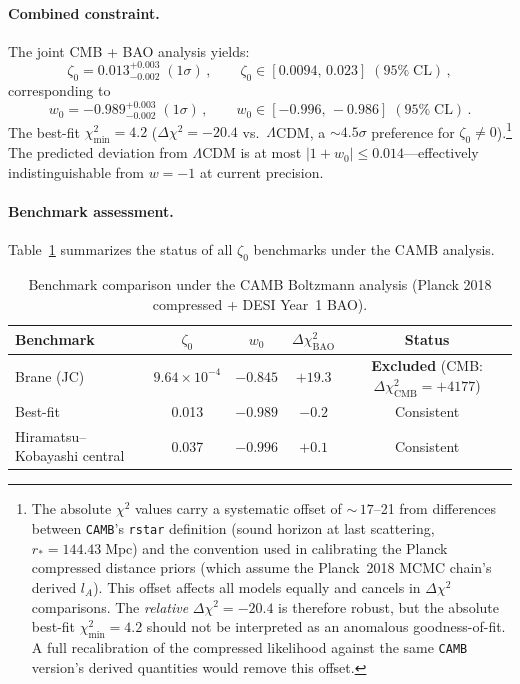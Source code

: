\paragraph{Combined constraint.} The joint CMB + BAO analysis yields:
\begin{equation}
\zeta_0 = 0.013^{+0.003}_{-0.002}\;(1\sigma)\,,\qquad
\zeta_0 \in [0.0094,\,0.023]\;(95\%\;\mathrm{CL})\,,
\label{eq:2-zeta0-CAMB}
\end{equation}
corresponding to
\begin{equation}
w_0 = -0.989^{+0.003}_{-0.002}\;(1\sigma)\,,\qquad
w_0 \in [-0.996,\,-0.986]\;(95\%\;\mathrm{CL})\,.
\label{eq:2-w0-CAMB}
\end{equation}
The best-fit $\chi^2_\mathrm{min} = 4.2$ ($\Delta\chi^2 = -20.4$ vs.\ $\Lambda$CDM, a ${\sim}4.5\sigma$ preference for $\zeta_0 \neq 0$).\footnote{The absolute $\chi^2$ values carry a systematic offset of ${\sim}\,17$--21 from differences between \texttt{CAMB}'s \texttt{rstar} definition (sound horizon at last scattering, $r_* = 144.43\;\mathrm{Mpc}$) and the convention used in calibrating the Planck compressed distance priors (which assume the Planck~2018 MCMC chain's derived $l_A$). This offset affects all models equally and cancels in $\Delta\chi^2$ comparisons. The \emph{relative} $\Delta\chi^2 = -20.4$ is therefore robust, but the absolute best-fit $\chi^2_\mathrm{min} = 4.2$ should not be interpreted as an anomalous goodness-of-fit. A full recalibration of the compressed likelihood against the same \texttt{CAMB} version's derived quantities would remove this offset.} The predicted deviation from $\Lambda$CDM is at most $|1+w_0| \leq 0.014$---effectively indistinguishable from $w = -1$ at current precision.

\paragraph{Benchmark assessment.} Table~\ref{tab:2-benchmarks-CAMB} summarizes the status of all $\zeta_0$ benchmarks under the CAMB analysis.

\begin{table}[htbp]
\centering
\caption{Benchmark comparison under the CAMB Boltzmann analysis (Planck 2018 compressed + DESI Year~1 BAO).}
\label{tab:2-benchmarks-CAMB}
\begin{tabular}{lcccc}
\toprule
Benchmark & $\zeta_0$ & $w_0$ & $\Delta\chi^2_\mathrm{BAO}$ & Status \\
\midrule
Brane (JC) & $9.64 \times 10^{-4}$ & $-0.845$ & $+19.3$ & \textbf{Excluded} (CMB: $\Delta\chi^2_\mathrm{CMB} = +4177$) \\
Best-fit & 0.013 & $-0.989$ & $-0.2$ & Consistent \\
Hiramatsu--Kobayashi central & 0.037 & $-0.996$ & $+0.1$ & Consistent \\
\bottomrule
\end{tabular}
\end{table}

